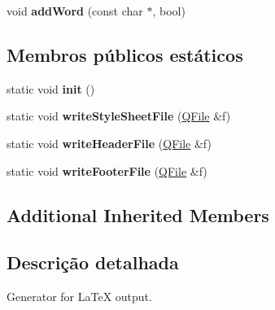 \begin{DoxyCompactItemize}
\item 
\hypertarget{class_latex_generator_a1243ea01d31796d179387017700b7d12}{void {\bfseries add\-Word} (const char $\ast$, bool)}\label{class_latex_generator_a1243ea01d31796d179387017700b7d12}

\end{DoxyCompactItemize}
\subsection*{Membros públicos estáticos}
\begin{DoxyCompactItemize}
\item 
\hypertarget{class_latex_generator_a02fd73d861ef2e4aabb38c0c9ff82947}{static void {\bfseries init} ()}\label{class_latex_generator_a02fd73d861ef2e4aabb38c0c9ff82947}

\item 
\hypertarget{class_latex_generator_a7514095bf4f9d60188adb23a9ac59589}{static void {\bfseries write\-Style\-Sheet\-File} (\hyperlink{class_q_file}{Q\-File} \&f)}\label{class_latex_generator_a7514095bf4f9d60188adb23a9ac59589}

\item 
\hypertarget{class_latex_generator_aba8f88db2787327cd350fae2cff4cd34}{static void {\bfseries write\-Header\-File} (\hyperlink{class_q_file}{Q\-File} \&f)}\label{class_latex_generator_aba8f88db2787327cd350fae2cff4cd34}

\item 
\hypertarget{class_latex_generator_a51e7cc306518949f9b2166187b5154c8}{static void {\bfseries write\-Footer\-File} (\hyperlink{class_q_file}{Q\-File} \&f)}\label{class_latex_generator_a51e7cc306518949f9b2166187b5154c8}

\end{DoxyCompactItemize}
\subsection*{Additional Inherited Members}


\subsection{Descrição detalhada}
Generator for La\-Te\-X output. 

